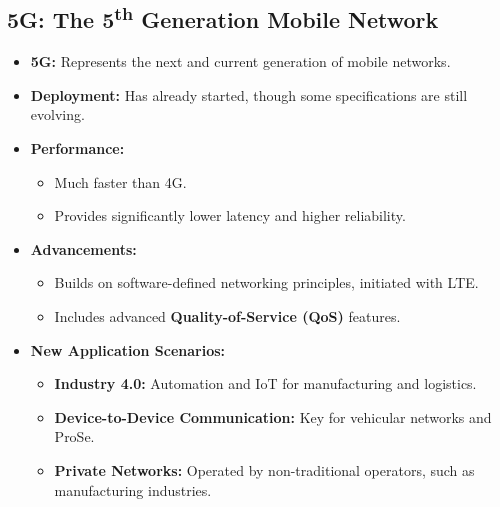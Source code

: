 \subsection{5G: The 5\textsuperscript{th} Generation Mobile Network}
\begin{itemize}
    \item \textbf{5G:} Represents the next and current generation of mobile networks.
    \item \textbf{Deployment:} Has already started, though some specifications are still evolving.
    \item \textbf{Performance:} 
    \begin{itemize}
        \item Much faster than 4G.
        \item Provides significantly lower latency and higher reliability.
    \end{itemize}
    \item \textbf{Advancements:}
    \begin{itemize}
        \item Builds on software-defined networking principles, initiated with LTE.
        \item Includes advanced \textbf{Quality-of-Service (QoS)} features.
    \end{itemize}
    \item \textbf{New Application Scenarios:}
    \begin{itemize}
        \item \textbf{Industry 4.0:} Automation and IoT for manufacturing and logistics.
        \item \textbf{Device-to-Device Communication:} Key for vehicular networks and ProSe.
        \item \textbf{Private Networks:} Operated by non-traditional operators, such as manufacturing industries.
    \end{itemize}
\end{itemize}

